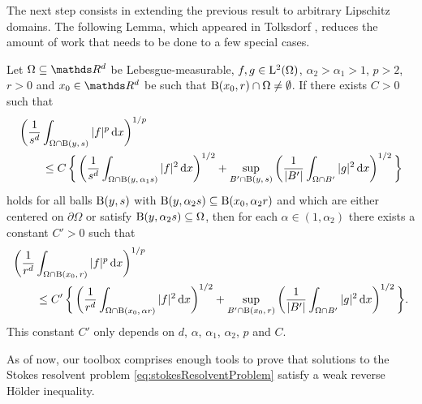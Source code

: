The next step consists in extending the previous result to arbitrary Lipschitz domains. 
The following Lemma, which appeared in Tolksdorf \cite[Lem.\@~4.2]{tolksdorf2017}, reduces the amount of work that needs to be done to a few special cases.

\begin{lem}
  \label{lem:ballsforballs}
  Let $\Omega \subseteq \R^d$ be Lebesgue-measurable, $f, g \in \mathrm{L}^2(\Omega)$, $\alpha_2 > \alpha_1 > 1$, $p > 2$, $r > 0$ and $x_0 \in \R^d$ be such that $\mathrm{B}(x_0,r) \cap \Omega \neq \emptyset$.
  If there exists $C > 0$ such that
  \begin{align*}
    &\bigg( \frac{1}{s^d} \int_{\Omega \cap \mathrm{B}(y,\, s)} |f|^p \, {\operatorname{d}\!{x}} \bigg)^{1/p} \\
    &\qquad\leq C\, \bigg\{\, \bigg( \frac{1}{s^d} \int_{\Omega \cap \mathrm{B}(y,\, \alpha_1 s)} |f|^2 \, {\operatorname{d}\!{x}} \bigg)^{1/2} 
    + \sup_{B' \cap \mathrm{B}(y,\,s)} \bigg( \frac{1}{|B'|} \int_{\Omega \cap B'} |g|^2 \, {\operatorname{d}\!{x}} \bigg)^{1/2} \, \bigg\}
  \end{align*}
  holds for all balls $\mathrm{B}(y,s)$ with $\mathrm{B}(y,\alpha_2 s) \subseteq \mathrm{B}(x_0, \alpha_2 r)$ and which are either centered on $\partial\Omega$ or satisfy $\mathrm{B}(y,\alpha_2 s) \subseteq \Omega$, then for each $\alpha \in (1,\alpha_2)$ there exists a constant $C' > 0$ such that
  \begin{align*}
    &\bigg( \frac{1}{r^d} \int_{\Omega \cap \mathrm{B}(x_0,\, r)} |f|^p \, {\operatorname{d}\!{x}} \bigg)^{1/p} 
    \\
    &\qquad\leq C'\, \bigg\{\, \bigg( \frac{1}{r^d} \int_{\Omega \cap \mathrm{B}(x_0,\,\alpha  r)} |f|^2 \, {\operatorname{d}\!{x}} \bigg)^{1/2} + \sup_{B' \cap \mathrm{B}(x_0,\,r)} \bigg( \frac{1}{|B'|} \int_{\Omega \cap B'} |g|^2 \, {\operatorname{d}\!{x}} \bigg)^{1/2} \,\bigg\}.
  \end{align*}
  This constant $C'$ only depends on $d$, $\alpha$, $\alpha_1$, $\alpha_2$, $p$ and $C$.
\end{lem}


As of now, our toolbox comprises enough tools to prove that solutions to the Stokes resolvent problem \eqref{eq:stokesResolventProblem} satisfy a weak reverse H\"older inequality.


